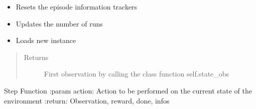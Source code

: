\documentclass[letterpaper,10pt,english]{sphinxmanual}
\begin{document}
\begin{fulllineitems}

\begin{fulllineitems}
\label{\detokenize{environments:environments.env_tetris_scheduling.Env.reset}}\begin{itemize}
\item {} 
\sphinxAtStartPar
Resets the episode information trackers

\item {} 
\sphinxAtStartPar
Updates the number of runs

\item {} 
\sphinxAtStartPar
Loads new instance

\end{itemize}
\begin{quote}\begin{description}
\item[{Returns}] \leavevmode
\sphinxAtStartPar
First observation by calling the class function self.state\_obs

\end{description}\end{quote}

\end{fulllineitems}


\begin{fulllineitems}
\label{\detokenize{environments:environments.env_tetris_scheduling.Env.step}}
\sphinxAtStartPar
Step Function
:param action: Action to be performed on the current state of the environment
:return: Observation, reward, done, infos

\end{fulllineitems}



\end{fulllineitems}
\end{document}
